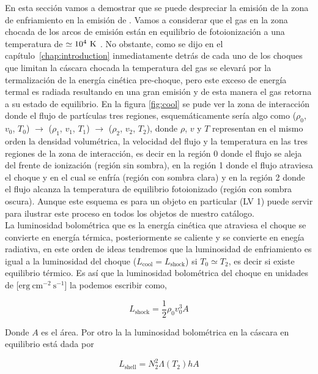 En esta sección vamos a demostrar que se puede despreciar la emisión de la zona de enfriamiento en la emisión de \ha{}. Vamos a considerar que el gas en la zona chocada de los arcos de emisión están en equilibrio de fotoionización a una temperatura de \(\simeq10^{4}~\mathrm{K}\) \citep{Henney:2002, Henney:2002a}. No obstante, como se dijo en el capítulo~\ref{chap:introduction} inmediatamente detrás de cada uno de los choques que limitan la cáscara chocada la temperatura del gas se elevará por la termalización de la energía cinética pre-choque, pero este exceso de energía termal es radiada resultando en una gran emisión y de esta manera el gas retorna a su estado de equilibrio. En la figura \ref{fig:cool} se pude ver la zona de interacción donde el flujo de partículas tres regiones, esquemáticamente sería algo como (\(\rho_{0}\), \(v_{0}\), \(T_{0}\)) \(\rightarrow\) (\(\rho_{1}\), \(v_{1}\), \(T_{1}\)) \(\rightarrow\) (\(\rho_{2}\), \(v_{2}\), \(T_{2}\)), donde \(\rho\), \(v\) y \(T\) representan en el mismo orden la densidad volumétrica, la velocidad del flujo y la temperatura en las tres regiones de la zona de interacción, es decir en la región 0 donde el flujo se aleja del frente de ionización (región sin sombra), en la región 1 donde el flujo atraviesa el choque y en el cual se enfría (región con sombra clara) y en la región 2 donde el flujo alcanza la temperatura de equilibrio fotoionizado (región con sombra oscura). Aunque este esquema es para un objeto en particular (LV 1) puede servir para ilustrar este proceso en todos los objetos de nuestro catálogo.\\ 

La luminosidad bolométrica que  es la energía cinética que atraviesa el choque se convierte en energía térmica, posteriormente se caliente y se convierte en enegía radiativa, en este orden de ideas tendremos que la luminosidad de enfriamiento es igual a la luminosidad del choque (\(L_{\text{cool}} = L_{\text{shock}}\)) si \(T_{0} \simeq T_{2}\), es decir si existe equilibrio térmico. Es así que la luminosidad bolométrica del choque en unidades de [\(\mathrm{erg~cm^{-2}~s^{-1}}\)] la podemos escribir como,

\begin{equation}
  \label{eq:lumi-shock}
  L_{\text{shock}} = \frac{1}{2} \rho_{0} v^{3}_{0} A
\end{equation}

Donde \(A\) es el área. Por otro la la luminosidad bolométrica en la cáscara en equilibrio está dada por 

\begin{equation}
  \label{eq:equi}
  L_{\text{shell}} = N^{2}_{2} \Lambda(T_{2}) h A
\end{equation}

